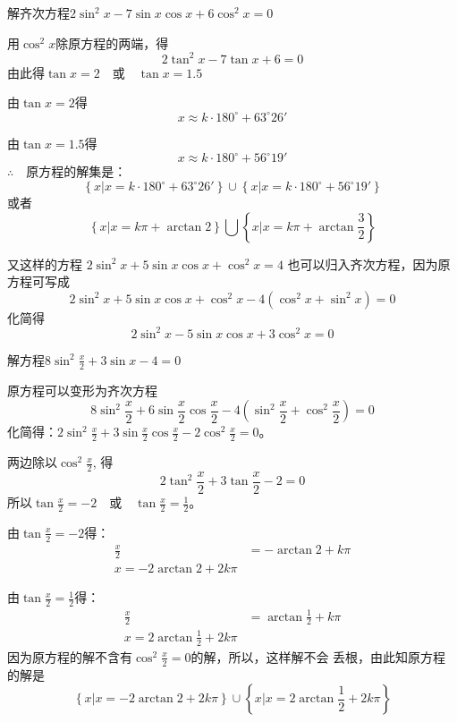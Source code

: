 \begin{example}
    解齐次方程$2\sin^2x-7\sin x\cos x+6\cos^2x=0$
\end{example}

\begin{solution}
用$\cos^2x$除原方程的两端，得
\[2\tan^2 x-7\tan x+6=0\]
由此得$\tan x=2\quad \text{或}\quad \tan x=1.5$

由$\tan x=2$得
\[x\approx k\cdot 180^{\circ}+63^{\circ}26'\]

由$\tan x=1.5$得
\[x\approx k\cdot 180^{\circ}+56^{\circ}19'\]
$\therefore\quad $原方程的解集是：
\[\left\{x\big|x=k\cdot 180^{\circ}+63^{\circ}26' \right\}\cup \left\{x\big|x=k\cdot 180^{\circ}+56^{\circ}19' \right\}\]
或者
\[\left\{x\big|x=k\pi+\arctan 2 \right\}\bigcup\left\{x\big|x=k\pi+\arctan\frac{3}{2} \right\}\]

又这样的方程
$2\sin^2x+5\sin x\cos x+\cos^2x=4$
也可以归入齐次方程，因为原方程可写成
\[2\sin^2x+5\sin x\cos x+\cos^2x-4(\cos^2x+\sin^2x)=0\]
化简得
\[2\sin^2x-5\sin x\cos x+3\cos^2x=0\]
\end{solution}

\begin{example}
    解方程$8\sin^2\frac{x}{2}+3\sin x-4=0$
\end{example}

\begin{solution}
    原方程可以变形为齐次方程
\[8\sin^2\frac{x}{2}+6\sin \frac{x}{2}\cos\frac{x}{2}-4\left(\sin^2\frac{x}{2}+\cos^2\frac{x}{2}\right)=0\]
化简得：$2\sin^2\frac{x}{2}+3\sin\frac{x}{2}\cos\frac{x}{2}-2\cos^2\frac{x}{2}=0$。

两边除以$\cos^2\frac{x}{2}$, 得
    \[2\tan^2\frac{x}{2}+3\tan\frac{x}{2}-2=0\]
所以$\tan\frac{x}{2}=-2\quad \text{或}\quad \tan\frac{x}{2}=\frac{1}{2}$。

由$\tan\frac{x}{2}=-2$得：
\[\begin{split}
    \frac{x}{2}&=-\arctan 2+k\pi\\
    x=-2\arctan 2+2k\pi
\end{split}\]

由$\tan\frac{x}{2}=\frac{1}{2}$得：
\[\begin{split}
    \frac{x}{2}&=\arctan \frac{1}{2}+k\pi\\
    x=2\arctan \frac{1}{2}+2k\pi
\end{split}\]
因为原方程的解不含有$\cos^2\frac{x}{2}=0$的解，所以，这样解不会
丢根，由此知原方程的解是
\[\left\{x\big|x=-2\arctan 2+2k\pi \right\}\cup \left\{x\big|x=2\arctan \frac{1}{2}+2k\pi \right\}\]
\end{solution}

